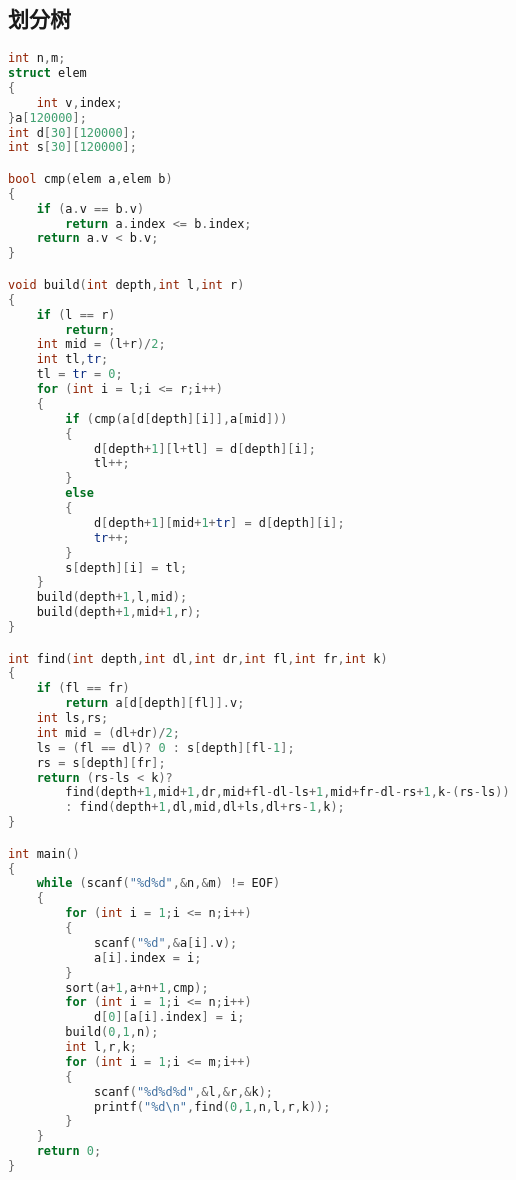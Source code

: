 \subsection{划分树}
	\begin{lstlisting}[language=c++]
int n,m;
struct elem
{
	int v,index;
}a[120000];
int d[30][120000];
int s[30][120000];

bool cmp(elem a,elem b)
{
	if (a.v == b.v)
		return a.index <= b.index;
	return a.v < b.v;
}

void build(int depth,int l,int r)
{
	if (l == r)
		return;
	int mid = (l+r)/2;
	int tl,tr;
	tl = tr = 0;
	for (int i = l;i <= r;i++)
	{
		if (cmp(a[d[depth][i]],a[mid]))
		{
			d[depth+1][l+tl] = d[depth][i];
			tl++;
		}
		else
		{
			d[depth+1][mid+1+tr] = d[depth][i];
			tr++;
		}
		s[depth][i] = tl;
	}
	build(depth+1,l,mid);
	build(depth+1,mid+1,r);
}

int find(int depth,int dl,int dr,int fl,int fr,int k)
{
	if (fl == fr)
		return a[d[depth][fl]].v;
	int ls,rs;
	int mid = (dl+dr)/2;
	ls = (fl == dl)? 0 : s[depth][fl-1];
	rs = s[depth][fr];
	return (rs-ls < k)?
		find(depth+1,mid+1,dr,mid+fl-dl-ls+1,mid+fr-dl-rs+1,k-(rs-ls))
		: find(depth+1,dl,mid,dl+ls,dl+rs-1,k);
}

int main()
{
	while (scanf("%d%d",&n,&m) != EOF)
	{
		for (int i = 1;i <= n;i++)
		{
			scanf("%d",&a[i].v);
			a[i].index = i;
		}
		sort(a+1,a+n+1,cmp);
		for (int i = 1;i <= n;i++)
			d[0][a[i].index] = i;
		build(0,1,n);
		int l,r,k;
		for (int i = 1;i <= m;i++)
		{
			scanf("%d%d%d",&l,&r,&k);
			printf("%d\n",find(0,1,n,l,r,k));
		}
	}
	return 0;
}
	\end{lstlisting}